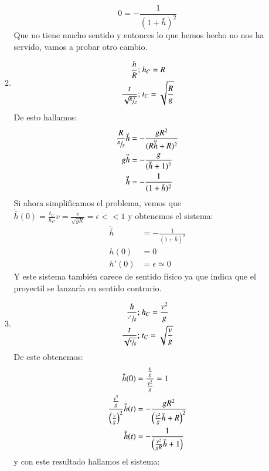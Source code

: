\begin{ex}[H1.4]
\begin{enumerate}[a)]
\begin{enumerate}[(1)]
            $$
                0 =  -\frac{1}{(1+\bar h)^2}
            $$
            Que no tiene mucho sentido y entonces lo que hemos hecho no nos ha servido, vamos a probar otro cambio.
            \item
            \begin{align*}
                \frac{h}{R};&\ h_C = R\\
                \frac{t}{\sqrt{\sfrac{R}{g}}};&\ t_C = \sqrt{\frac{R}{g}}
            \end{align*}
            De esto hallamos:
            \begin{align*}
                \frac{R}{\sfrac{R}{g}} \ddot{\bar h} &= - \frac{gR^2}{(R\ddot{\bar h} + R)^2}\\
                g\ddot{\bar h} &= -\frac{g}{(\bar h + 1)^2}\\
                \ddot{\bar h} &= - \frac{1}{(1+\bar h)^2}
            \end{align*}
            Si ahora simplificamos el problema, vemos que $\dot{\bar h}(0) = \frac{t_C}{h_C} v = \frac{v}{\sqrt{g R}} = \epsilon << 1$ y obtenemos el sistema:
            \begin{align*}
                \ddot{\bar h} &= - \frac{1}{(1+\bar h)^2}\\
                h(0) &= 0\\
                h'(0) &= \epsilon \simeq 0
            \end{align*}
            Y este sistema también carece de sentido físico ya que indica que el proyectil se lanzaría en sentido contrario.
            \item
            \begin{align*}
                \frac{h}{\sfrac{v^2}{g}};&\ h_C = \frac{v^2}{g}\\
                \frac{t}{\sqrt{\sfrac{v}{g}}};&\ t_C = \sqrt{\frac{v}{g}}
            \end{align*}
            De este obtenemos:
            \begin{align*}
                \dot{\bar {h}} (0) &= \frac{ \frac{v}{g}  }{ \frac{v^2}{g} } = 1\\
                \frac{ \frac{v^2}{g}  }{ \left(\frac{v}{g}\right)^2 } \ddot{\bar h}(t) &= -\frac{gR^2}{\left(\frac{v^2}{g}\bar h + R\right)^2}\\
                \ddot{\bar h}(t) &= - \frac{1}{\left( \frac{v^2}{gR} \bar h + 1 \right)}
            \end{align*}
            y con este resultado hallamos el sistema:
            \begin{align*}

\end{align*}
\end{enumerate}
\end{enumerate}
\end{ex}
